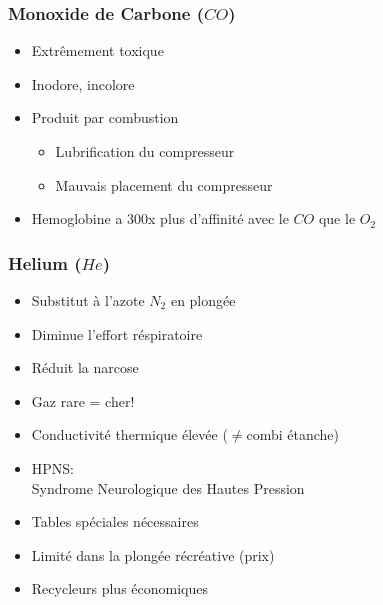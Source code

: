 \documentclass[aspectratio=1610,english,12pt]{beamer}
\begin{document}
\begin{frame}{\insertsubsubsection}
\end{frame}

\subsubsection{Monoxide de Carbone ($CO$)}
\begin{frame}{\insertsubsubsection}
	\begin{itemize}
		\item Extrêmement toxique
		\item Inodore, incolore
		\item Produit par combustion
		\begin{itemize}
			\item Lubrification du compresseur
			\item Mauvais placement du compresseur
		\end{itemize}
		\item Hemoglobine a 300x plus d'affinité avec le $CO$ que le $O_2$
	\end{itemize}
\end{frame}

\subsubsection{Helium ($He$)}
\begin{frame}{\insertsubsubsection}
	\begin{itemize}
		\item Substitut à l'azote $N_2$ en plongée
		\item Diminue l'effort réspiratoire
		\item Réduit la narcose
		\item Gaz rare = cher!
		\item Conductivité thermique élevée ($\ne$combi étanche)
		\item HPNS:\\Syndrome Neurologique des Hautes Pression
		\item Tables spéciales nécessaires
		\item Limité dans la plongée récréative (prix)
		\item Recycleurs plus économiques
	\end{itemize}
\end{frame}

\end{document}
